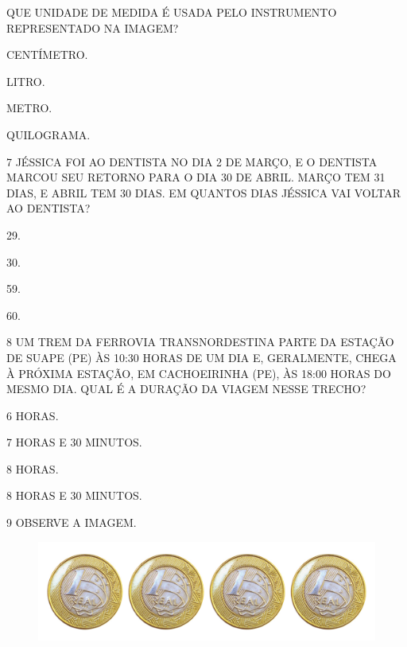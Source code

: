 QUE UNIDADE DE MEDIDA É USADA PELO INSTRUMENTO REPRESENTADO NA IMAGEM?

\begin{escolha}[itemsep=0pt]
\item CENTÍMETRO.

\item LITRO.

\item METRO.

\item QUILOGRAMA.
\end{escolha}

\pagebreak
\num{7} JÉSSICA FOI AO DENTISTA NO DIA 2 DE MARÇO, E O DENTISTA MARCOU SEU
RETORNO PARA O DIA 30 DE ABRIL. MARÇO TEM 31 DIAS, E ABRIL TEM 30 DIAS. EM QUANTOS DIAS JÉSSICA VAI VOLTAR AO DENTISTA?

\begin{escolha}
\item 29.

\item 30.

\item 59.

\item 60.
\end{escolha}

\num{8} UM TREM DA FERROVIA TRANSNORDESTINA PARTE DA ESTAÇÃO DE SUAPE (PE) ÀS 10:30 
HORAS DE UM DIA E, GERALMENTE, CHEGA À PRÓXIMA ESTAÇÃO, EM CACHOEIRINHA (PE), ÀS 
18:00 HORAS DO MESMO DIA. QUAL É A DURAÇÃO DA VIAGEM NESSE TRECHO?

\begin{escolha}
\item 6 HORAS.

\item 7 HORAS E 30 MINUTOS.

\item 8 HORAS.

\item 8 HORAS E 30 MINUTOS.
\end{escolha}

\num{9} OBSERVE A IMAGEM.


\begin{figure}[H]
\centering
\includegraphics[width=.6\textwidth]{./media/SAEB_1ANO_MAT_FIGURA124.png}
\end{figure}

